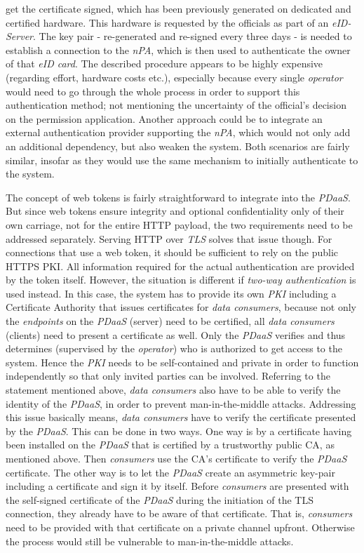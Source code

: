 \documentclass[12pt,english,a4paper,titlepage,cleardoublepage=empty,dottedtoc]{report}
\begin{document}
get the certificate signed, which has been previously generated on
dedicated and certified hardware. This hardware is requested by the
officials as part of an \emph{eID-Server}. The key pair - re-generated
and re-signed every three days - is needed to establish a connection to
the \emph{nPA}, which is then used to authenticate the owner of that
\emph{eID card}. The described procedure appears to be highly expensive
(regarding effort, hardware costs etc.), especially because every single
\emph{operator} would need to go through the whole process in order to
support this authentication method; not mentioning the uncertainty of
the official's decision on the permission application. Another approach
could be to integrate an external authentication provider supporting the
\emph{nPA}, which would not only add an additional dependency, but also
weaken the system. Both scenarios are fairly similar, insofar as they
would use the same mechanism to initially authenticate to the system.

The concept of web tokens is fairly straightforward to integrate into
the \emph{PDaaS}. But since web tokens ensure integrity and optional
confidentiality only of their own carriage, not for the entire HTTP
payload, the two requirements need to be addressed separately. Serving
HTTP over \emph{TLS} solves that issue though. For connections that use
a web token, it should be sufficient to rely on the public HTTPS PKI.
All information required for the actual authentication are provided by
the token itself. However, the situation is different if \emph{two-way
authentication} is used instead. In this case, the system has to provide
its own \emph{PKI} including a Certificate Authority that issues
certificates for \emph{data consumers}, because not only the
\emph{endpoints} on the \emph{PDaaS} (server) need to be certified, all
\emph{data consumers} (clients) need to present a certificate as well.
Only the \emph{PDaaS} verifies and thus determines (supervised by the
\emph{operator}) who is authorized to get access to the system. Hence
the \emph{PKI} needs to be self-contained and private in order to
function independently so that only invited parties can be involved.
Referring to the statement mentioned above, \emph{data consumers} also
have to be able to verify the identity of the \emph{PDaaS}, in order to
prevent man-in-the-middle attacks. Addressing this issue basically
means, \emph{data consumers} have to verify the certificate presented by
the \emph{PDaaS}. This can be done in two ways. One way is by a
certificate having been installed on the \emph{PDaaS} that is certified
by a trustworthy public CA, as mentioned above. Then \emph{consumers}
use the CA's certificate to verify the \emph{PDaaS} certificate. The
other way is to let the \emph{PDaaS} create an asymmetric key-pair
including a certificate and sign it by itself. Before \emph{consumers}
are presented with the self-signed certificate of the \emph{PDaaS}
during the initiation of the TLS connection, they already have to be
aware of that certificate. That is, \emph{consumers} need to be provided
with that certificate on a private channel upfront. Otherwise the
process would still be vulnerable to man-in-the-middle attacks.
\end{document}
